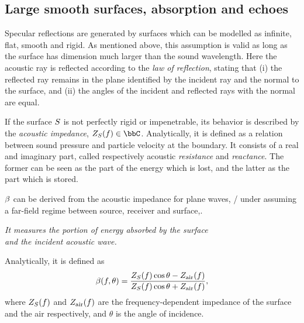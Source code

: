 \subsection{Large smooth surfaces, absorption and echoes}
Specular reflections are generated by surfaces which can be modelled as infinite, flat, smooth and rigid.
As mentioned above, this assumption is valid as long as the surface has dimension much larger than the sound wavelength.
Here the acoustic ray is reflected according to the \textit{law of reflection}, stating that
(i) the reflected ray remains in the plane identified by the incident ray and the normal to the surface,
and (ii) the angles of the incident and reflected rays with the normal are equal.

If the surface $S$ is not perfectly rigid or impenetrable, its behavior is described by the \textit{acoustic impedance}, $\impedence_\surface(f) \in \bbC$.
Analytically, it is defined as a relation between sound pressure and particle velocity at the boundary.
It consists of a real and imaginary part, called respectively acoustic \textit{resistance} and \textit{reactance}.
The former can be seen as the part of the energy which is lost, and the latter as the part which is stored.

 $\beta$ can be derived from the acoustic impedance
for plane waves, \ie/ under assuming a far-field regime between source, receiver and surface,.
\begin{center}
    \textit{It measures the portion of energy absorbed by the surface
    \\and the incident acoustic wave.}
\end{center}
Analytically, it is defined as  
\begin{equation}
    \beta(f, \theta) = \frac{Z_{S}(f)\cos{\theta} - Z_\text{air}(f)}{Z_{S}(f)\cos{\theta} + Z_\text{air}(f)}
    ,
\end{equation}
where $Z_{S}(f)$ and $Z_\text{air}(f)$ are the frequency-dependent impedance of the surface and the air respectively,
and $\theta$ is the angle of incidence.


